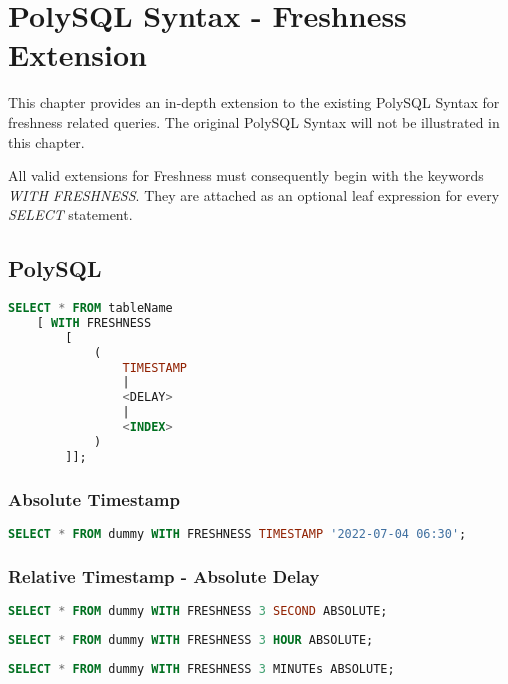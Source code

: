 \chapter{PolySQL Syntax - Freshness Extension}

This chapter provides an in-depth extension to the existing PolySQL Syntax for freshness related queries.
The original PolySQL Syntax will not be illustrated in this chapter.

All valid extensions for Freshness must consequently begin with the keywords \emph{WITH FRESHNESS}.
They are attached as an optional leaf expression for every \emph{SELECT} statement.

\tocless\section{PolySQL}


\begin{lstlisting}[language=sql]
    SELECT * FROM tableName 
    [ WITH FRESHNESS 
        [ 
            ( 
                TIMESTAMP 
                | 
                <DELAY> 
                | 
                <INDEX> 
            )   
        ]];
\end{lstlisting}

\tocless\subsection{Absolute Timestamp}

\begin{lstlisting}[language=sql]
    SELECT * FROM dummy WITH FRESHNESS TIMESTAMP '2022-07-04 06:30';
\end{lstlisting}


\tocless\subsection{Relative Timestamp - Absolute Delay}

\begin{lstlisting}[language=sql]
    SELECT * FROM dummy WITH FRESHNESS 3 SECOND ABSOLUTE;
\end{lstlisting}

\begin{lstlisting}[language=sql]
    SELECT * FROM dummy WITH FRESHNESS 3 HOUR ABSOLUTE;
\end{lstlisting}

\begin{lstlisting}[language=sql]
    SELECT * FROM dummy WITH FRESHNESS 3 MINUTEs ABSOLUTE;
\end{lstlisting}

